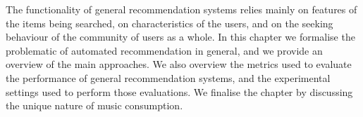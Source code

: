 The functionality of general recommendation systems relies mainly on features of the items being searched, on characteristics of the users, and on the seeking behaviour of the community of users as a whole. 
In this chapter we formalise the problematic of automated recommendation in general, and we provide an overview of the main approaches.
We also overview the metrics used to evaluate the performance of general recommendation systems, and the experimental settings used to perform those evaluations.
We finalise the chapter by discussing the unique nature of music consumption.





